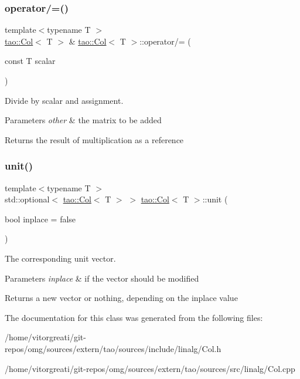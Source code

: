 \subsubsection{\texorpdfstring{operator/=()}{operator/=()}\hspace{0.1cm}{\footnotesize\ttfamily [2/2]}}
{\footnotesize\ttfamily template$<$typename T $>$ \\
\mbox{\hyperlink{classtao_1_1_col}{tao\+::\+Col}}$<$ T $>$ \& \mbox{\hyperlink{classtao_1_1_col}{tao\+::\+Col}}$<$ T $>$\+::operator/= (\begin{DoxyParamCaption}\item[{const T}]{scalar }\end{DoxyParamCaption})}



Divide by scalar and assignment. 


\begin{DoxyParams}{Parameters}
{\em other} & the matrix to be added \\
\hline
\end{DoxyParams}
\begin{DoxyReturn}{Returns}
the result of multiplication as a reference 
\end{DoxyReturn}
\mbox{\label{classtao_1_1_col_ae913e98d4ed12cc7ee1975b2aff07c05}} 
\subsubsection{\texorpdfstring{unit()}{unit()}}
{\footnotesize\ttfamily template$<$typename T $>$ \\
std\+::optional$<$ \mbox{\hyperlink{classtao_1_1_col}{tao\+::\+Col}}$<$ T $>$ $>$ \mbox{\hyperlink{classtao_1_1_col}{tao\+::\+Col}}$<$ T $>$\+::unit (\begin{DoxyParamCaption}\item[{bool}]{inplace = {\ttfamily false} }\end{DoxyParamCaption})}



The corresponding unit vector. 


\begin{DoxyParams}{Parameters}
{\em inplace} & if the vector should be modified \\
\hline
\end{DoxyParams}
\begin{DoxyReturn}{Returns}
a new vector or nothing, depending on the inplace value 
\end{DoxyReturn}


The documentation for this class was generated from the following files\+:\begin{DoxyCompactItemize}
\item 
/home/vitorgreati/git-\/repos/omg/sources/extern/tao/sources/include/linalg/Col.\+h\item 
/home/vitorgreati/git-\/repos/omg/sources/extern/tao/sources/src/linalg/Col.\+cpp\end{DoxyCompactItemize}
